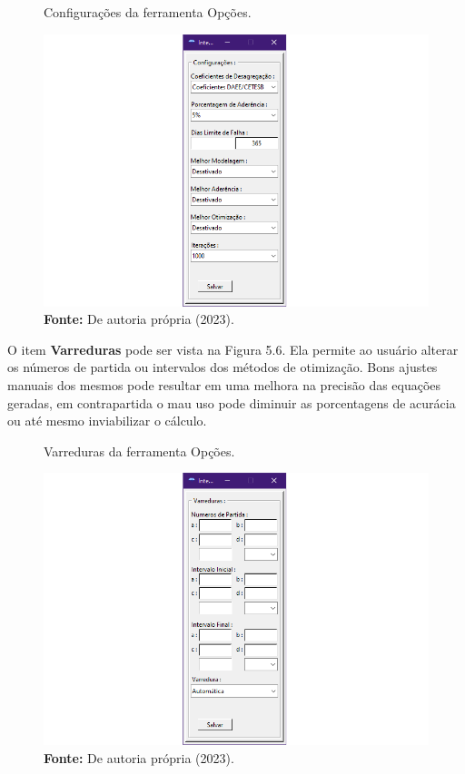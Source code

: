 \newpage

\begin{figure}[!ht]
	\centering
	\caption{Configurações da ferramenta Opções.}
	\includegraphics[width=.7615\linewidth]{figuras/configuracoes.png}
	\caption*{\textbf{Fonte:} De autoria própria (2023).}
	\label{fig:figuras/configuracoes.png}
\end{figure}

O item \textbf{Varreduras} pode ser vista na Figura 5.6. Ela permite ao usuário alterar os números de partida ou intervalos dos métodos de otimização. Bons ajustes manuais dos mesmos pode resultar em uma melhora na precisão das equações geradas, em contrapartida o mau uso pode diminuir as porcentagens de acurácia ou até mesmo inviabilizar o cálculo.\bigskip

\begin{figure}[!ht]
	\centering
	\caption{Varreduras da ferramenta Opções.}
	\includegraphics[width=.7615\linewidth]{figuras/varreduras.png}
	\caption*{\textbf{Fonte:} De autoria própria (2023).}
	\label{fig:figuras/varreduras.png}
\end{figure}

\newpage

